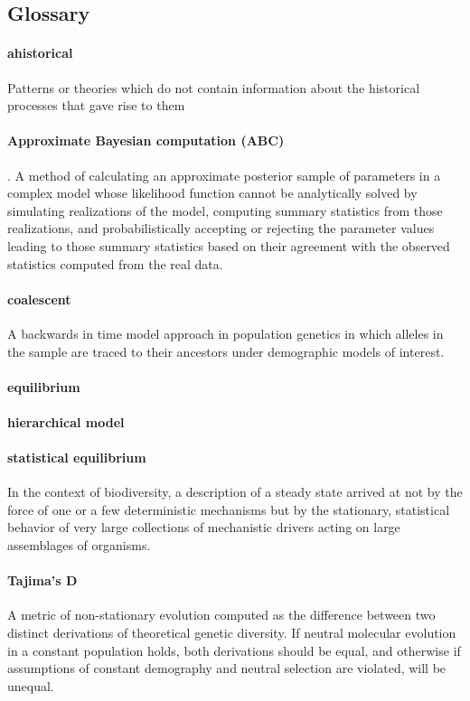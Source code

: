 \documentclass[12pt]{article}
\begin{document}
\subsection*{Glossary}

\paragraph{ahistorical} Patterns or theories which do not contain
information about the historical processes that gave rise to them

\paragraph{Approximate Bayesian computation (ABC)}. A method of
calculating an approximate posterior sample of parameters in a complex model
whose likelihood function cannot be analytically solved by simulating
realizations of the model, computing summary statistics from those
realizations, and probabilistically accepting or rejecting the
parameter values leading to those summary statistics based on their
agreement with the observed statistics computed from the real data.

\paragraph{coalescent} A backwards in time model approach in
population genetics in which alleles in the sample are traced to their
ancestors under demographic models of interest.

\paragraph{equilibrium}

\paragraph{hierarchical model}

\paragraph{statistical equilibrium} In the context of biodiversity, a
description of a steady state arrived at not by the force of one or a
few deterministic mechanisms but by the stationary, statistical
behavior of very large collections of mechanistic drivers acting on
large assemblages of organisms.

\paragraph{Tajima's D} A metric of non-stationary evolution computed
as the difference between two distinct derivations of theoretical
genetic diversity. If neutral molecular evolution in a constant
population holds, both derivations should be equal, and otherwise if
assumptions of constant demography and neutral selection are violated,
will be unequal.
\end{document}
